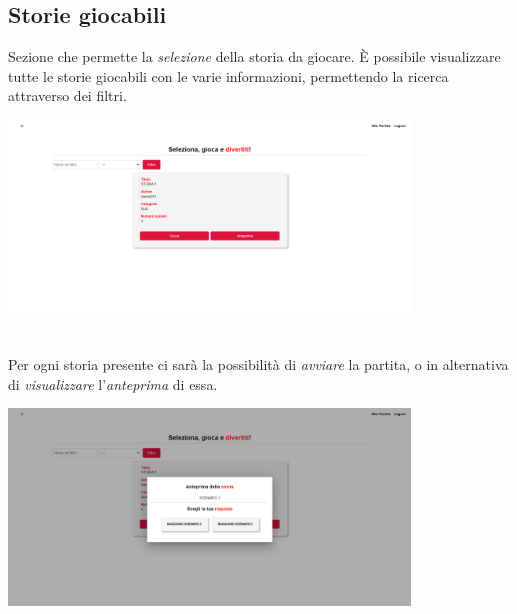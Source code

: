 \documentclass{article}
\begin{document}
\subsection*{Storie giocabili}
Sezione che permette la \textit{selezione} della storia da giocare. È possibile visualizzare tutte le storie giocabili con le varie informazioni, permettendo la ricerca attraverso dei filtri.
\begin{center}
    \includegraphics[width=0.8\textwidth]{foto21.png}
\end{center}\vspace*{7pt}\\
Per ogni storia presente ci sarà la possibilità di \textit{avviare} la partita, o in alternativa di \textit{visualizzare} l'\textit{anteprima} di essa.
\begin{center}
    \includegraphics[width=0.8\textwidth]{foto22.png}
\end{center}
\end{document}
